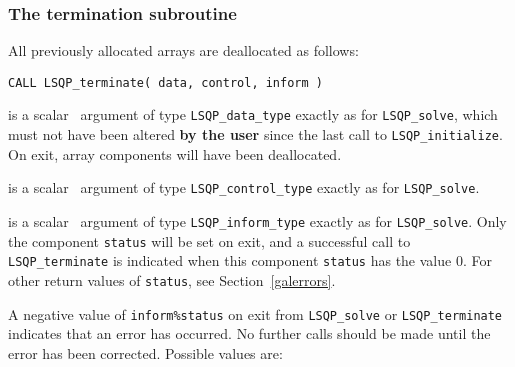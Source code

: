 \documentclass{galahad}
\newcommand{\packagename}{LSQP}
\begin{document}

\subsubsection{The  termination subroutine}
All previously allocated arrays are deallocated as follows:
\vspace*{1mm}

\hspace{8mm}
{\tt CALL \packagename\_terminate( data, control, inform )}

\vspace*{-3mm}
\begin{description}

 is a scalar \intentinout\ argument of type 
{\tt \packagename\_data\_type} 
exactly as for
{\tt \packagename\_solve},
which must not have been altered {\bf by the user} since the last call to 
{\tt \packagename\_initialize}.
On exit, array components will have been deallocated.

 is a scalar \intentin\ argument of type 
{\tt \packagename\_control\_type}
exactly as for
{\tt \packagename\_solve}.

 is a scalar \intentout\ argument of type
{\tt \packagename\_inform\_type}
exactly as for
{\tt \packagename\_solve}.
Only the component {\tt status} will be set on exit, and a 
successful call to 
{\tt \packagename\_terminate}
is indicated when this  component {\tt status} has the value 0. 
For other return values of {\tt status}, see Section~\ref{galerrors}.

\end{description}


\galerrors
A negative value of {\tt inform\%status} on exit from 
{\tt \packagename\_solve}
or 
{\tt \packagename\_terminate}
indicates that an error has occurred. No further calls should be made
until the error has been corrected. Possible values are:
\end{document}
